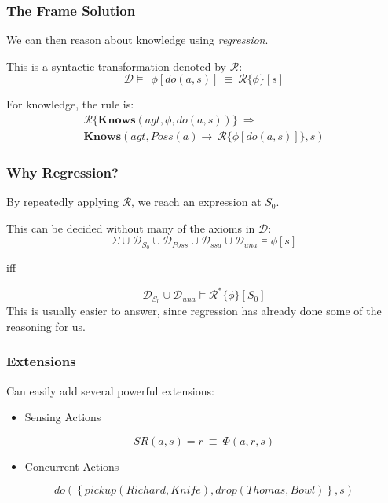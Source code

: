 \documentclass{beamer}
\begin{document}
\begin{frame}
\frametitle{The Frame Solution}
We can then reason about knowledge using \emph{regression}.

This is a syntactic transformation denoted by $\mathcal{R}$:
\begin{equation*}
\mathcal{D} \models\ \ \phi[do(a,s)]\ \equiv\ \mathcal{R}\{\phi\}[s]
\end{equation*}

\pause
For knowledge, the rule is:
\begin{multline*}
  \mathcal{R}\{\mathbf{Knows}(agt,\phi,do(a,s))\}\ \Rightarrow\ \\
    \mathbf{Knows}(agt,Poss(a) \rightarrow\ \mathcal{R}\{\phi[do(a,s)]\},s)
\end{multline*}
\end{frame}

\begin{frame}
\frametitle{Why Regression?}
By repeatedly applying $\mathcal{R}$, we reach an expression at $S_0$.

This can be decided without many of the axioms in $\mathcal{D}$:
\begin{equation*}
  \Sigma \cup \mathcal{D}_{S_0} \cup \mathcal{D}_{Poss} \cup \mathcal{D}_{ssa} \cup \mathcal{D}_{una} \models \phi[s]
\end{equation*}
\begin{center}
iff
\end{center}
\begin{equation*}
  \mathcal{D}_{S_0} \cup \mathcal{D}_{una} \models \mathcal{R}^{*}\{\phi\}[S_0]
\end{equation*}
This is usually easier to answer, since regression has already done some
of the reasoning for us.
\end{frame}

\begin{frame}
\frametitle{Extensions}
Can easily add several powerful extensions:

\begin{itemize}
\item Sensing Actions
\end{itemize}
\begin{equation*}
SR(a,s)=r\ \equiv\ \Phi(a,r,s)
\end{equation*}

\begin{itemize}
\item Concurrent Actions
\end{itemize}
\begin{equation*}
  do(\left\{pickup(Richard,Knife),drop(Thomas,Bowl)\right\},s)
\end{equation*}
\end{frame}
\end{document}

